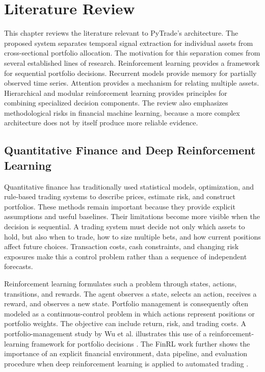 \section{Literature Review}

This chapter reviews the literature relevant to PyTrade's architecture. The proposed system separates temporal signal extraction for individual assets from cross-sectional portfolio allocation. The motivation for this separation comes from several established lines of research. Reinforcement learning provides a framework for sequential portfolio decisions. Recurrent models provide memory for partially observed time series. Attention provides a mechanism for relating multiple assets. Hierarchical and modular reinforcement learning provides principles for combining specialized decision components. The review also emphasizes methodological risks in financial machine learning, because a more complex architecture does not by itself produce more reliable evidence.

\subsection{Quantitative Finance and Deep Reinforcement Learning}

Quantitative finance has traditionally used statistical models, optimization, and rule-based trading systems to describe prices, estimate risk, and construct portfolios. These methods remain important because they provide explicit assumptions and useful baselines. Their limitations become more visible when the decision is sequential. A trading system must decide not only which assets to hold, but also when to trade, how to size multiple bets, and how current positions affect future choices. Transaction costs, cash constraints, and changing risk exposures make this a control problem rather than a sequence of independent forecasts.

Reinforcement learning formulates such a problem through states, actions, transitions, and rewards. The agent observes a state, selects an action, receives a reward, and observes a new state. Portfolio management is consequently often modeled as a continuous-control problem in which actions represent positions or portfolio weights. The objective can include return, risk, and trading costs. A portfolio-management study by Wu et al. illustrates this use of a reinforcement-learning framework for portfolio decisions \cite{Junfeng.2024}. The FinRL work further shows the importance of an explicit financial environment, data pipeline, and evaluation procedure when deep reinforcement learning is applied to automated trading \cite{liu2022finrldeepreinforcementlearning}.


